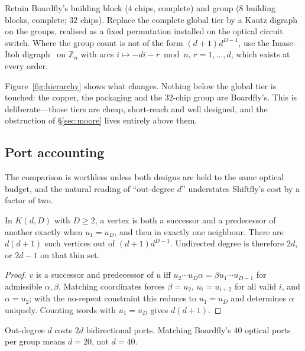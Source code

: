 \documentclass[sigconf,nonacm]{acmart}
\theoremstyle{acmdefinition}%
\newcommand{\Z}{\mathbb{Z}}
\begin{document}
\begin{definition}[Shiftfly]
Retain Boardfly's building block ($4$ chips, complete) and group ($8$ building
blocks, complete; $32$ chips). Replace the complete global tier by a Kautz
digraph on the groups, realised as a fixed permutation installed on the optical
circuit switch. Where the group count is not of the form $(d+1)d^{D-1}$, use the
Imase--Itoh digraph~\cite{imase1981,imase1983} on $\Z_n$ with arcs
$i\mapsto -di-r \bmod n$, $r=1,\dots,d$, which exists at every order.
\end{definition}

Figure~\ref{fig:hierarchy} shows what changes. Nothing below the global tier is
touched: the copper, the packaging and the $32$-chip group are Boardfly's. This
is deliberate---those tiers are cheap, short-reach and well designed, and the
obstruction of \S\ref{sec:moore} lives entirely above them.

\subsection{Port accounting}
\label{sec:ports}

The comparison is worthless unless both designs are held to the same optical
budget, and the natural reading of ``out-degree $d$'' understates Shiftfly's
cost by a factor of two.

\begin{proposition}
\label{prop:ports}
In $K(d,D)$ with $D\ge2$, a vertex is both a successor and a predecessor of
another exactly when $u_1=u_D$, and then in exactly one neighbour. There are
$d(d+1)$ such vertices out of $(d+1)d^{D-1}$. Undirected degree is therefore
$2d$, or $2d-1$ on that thin set.
\end{proposition}

\begin{proof}
$v$ is a successor and predecessor of $u$ iff $u_2\cdots u_D\alpha =
\beta u_1\cdots u_{D-1}$ for admissible $\alpha,\beta$. Matching coordinates
forces $\beta=u_2$, $u_i = u_{i+2}$ for all valid $i$, and $\alpha=u_2$; with
the no-repeat constraint this reduces to $u_1=u_D$ and determines $\alpha$
uniquely. Counting words with $u_1=u_D$ gives $d(d+1)$.
\end{proof}

\begin{corollary}
Out-degree $d$ costs $2d$ bidirectional ports. Matching Boardfly's $40$ optical
ports per group means $d=20$, not $d=40$.
\end{corollary}
\end{document}

